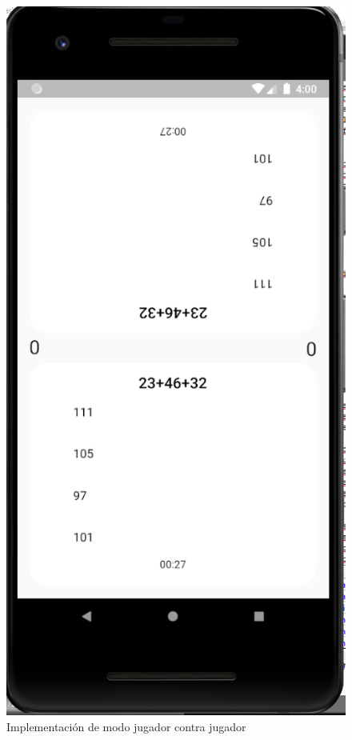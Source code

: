 \documentclass{article}
\begin{document}
\begin{figure}[H]
    \centering
    \includegraphics[scale=0.8]{imgs/Imp/Pvp}
    \caption{Implementación de modo jugador contra jugador}
    \label{fig:implementacion_04}
\end{figure}
\end{document}

